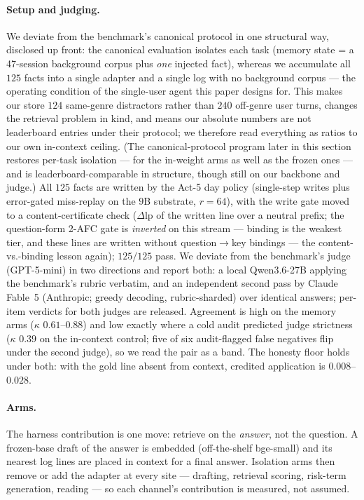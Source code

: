 \documentclass[11pt]{article}
\newcommand{\dlp}{\Delta\mathrm{lp}}
\begin{document}
\paragraph{Setup and judging.} We deviate from the benchmark's canonical protocol in one
structural way, disclosed up front: the canonical evaluation isolates each task (memory state =
a 47-session background corpus plus \emph{one} injected fact), whereas we accumulate all $125$
facts into a single adapter and a single log with no background corpus --- the operating
condition of the single-user agent this paper designs for. This makes our store $124$
same-genre distractors rather than $240$ off-genre user turns, changes the retrieval problem in
kind, and means our absolute numbers are not leaderboard entries under their protocol;
we therefore read everything as ratios to our own in-context ceiling. (The canonical-protocol
program later in this section restores per-task isolation --- for the in-weight arms as well
as the frozen ones --- and is leaderboard-comparable in structure, though still on our
backbone and judge.) All $125$ facts are
written by the Act-5 day policy
(single-step writes plus error-gated miss-replay on the $9$B substrate, $r{=}64$), with the
write gate moved to a content-certificate check ($\dlp$ of the written line over a neutral
prefix; the question-form 2-AFC gate is \emph{inverted} on this stream --- binding is the
weakest tier, and these lines are written without question$\to$key bindings --- the
content-vs.-binding lesson again); $125/125$ pass. We deviate from the benchmark's judge
(GPT-5-mini) in two directions and report both: a local Qwen3.6-27B applying the benchmark's
rubric verbatim, and an independent second pass by Claude Fable~5 (Anthropic; greedy decoding,
rubric-sharded) over identical answers; per-item verdicts for both judges are released. Agreement is high on the memory arms ($\kappa$ $0.61$--$0.88$) and low exactly where a
cold audit predicted judge strictness ($\kappa$ $0.39$ on the in-context control; five of six
audit-flagged false negatives flip under the second judge), so we read the pair as a band. The
honesty floor holds under both: with the gold line absent from context, credited application
is $0.008$--$0.028$.

\paragraph{Arms.} The harness contribution is one move: retrieve on the \emph{answer}, not the
question. A frozen-base draft of the answer is embedded (off-the-shelf bge-small) and its
nearest log lines are placed in context for a final answer. Isolation arms then remove or add
the adapter at every site --- drafting, retrieval scoring, risk-term generation, reading ---
so each channel's contribution is measured, not assumed.
\end{document}
